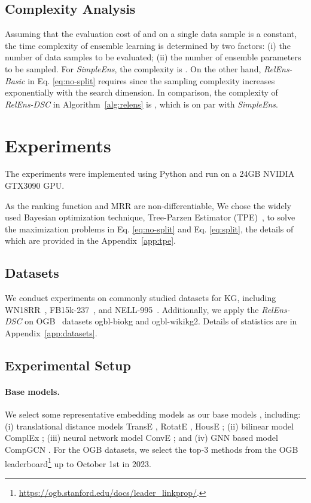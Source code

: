 \documentclass[11pt,a4paper]{article}
\begin{document}
  
  
  
  
  \subsection{Complexity Analysis}
  Assuming that the evaluation cost of  and  on a single data sample  is a constant,
  the time complexity of ensemble learning is determined by two factors:
  (i) the number of data samples to be evaluated;
  (ii) the number of ensemble parameters to be sampled.
  For \textit{SimpleEns}, the complexity is .
  On the other hand,
  \textit{RelEns-Basic} in Eq. \eqref{eq:no-split} requires 
  since the sampling complexity increases exponentially with the search dimension.
  In comparison,
  the complexity of \textit{RelEns-DSC} in Algorithm~\ref{alg:relens} is ,
  which is on par with \textit{SimpleEns}.
  
  
  \section{Experiments}
  The experiments were implemented using Python and run on a 24GB NVIDIA GTX3090 GPU.
  
  As the ranking function  and MRR are non-differentiable,
  We chose the widely used Bayesian optimization technique, 
  Tree-Parzen Estimator (TPE)~\cite{bergstra2015hyperopt}, 
  to solve the maximization problems in Eq. \eqref{eq:no-split} and Eq. \eqref{eq:split},
  the details of which are provided in the Appendix~\ref{app:tpe}.
  
  \subsection{Datasets}
  
  We conduct experiments on commonly studied datasets for KG,
  including WN18RR~\cite{dettmers2018convolutional}, FB15k-237~\cite{toutanova2015observed}, and NELL-995~\cite{xiong2017deeppath}.
  Additionally, we apply the  \textit{RelEns-DSC} on OGB~\cite{hu2020open} datasets ogbl-biokg and ogbl-wikikg2.
  Details of statistics are in Appendix~\ref{app:datasets}.
  
  \subsection{Experimental Setup}
  \paragraph{Base models.}
  We select some representative embedding models as our base models
  ,
  including:
  (i) translational distance models TransE \cite{bordes2013translating}, 
  RotatE \cite{sun2019rotate}, HousE \cite{li2022house};
  (ii) bilinear model ComplEx \cite{trouillon2017knowledge};
  (iii) neural network model ConvE \cite{dettmers2018convolutional};
  and (iv) GNN based model CompGCN \cite{vashishth2019composition}.
  For the OGB datasets,
  we select the top-3 methods from the OGB leaderboard\footnote{\url{https://ogb.stanford.edu/docs/leader_linkprop/}.}
  up to October 1st in 2023.
\end{document}
